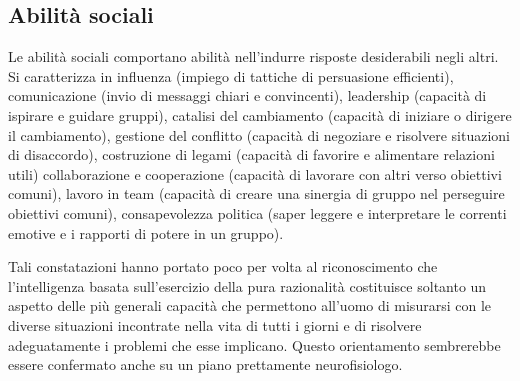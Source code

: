 \subsection{Abilità sociali}
Le abilità sociali comportano abilità nell'indurre risposte desiderabili negli altri. Si caratterizza in influenza (impiego di tattiche di persuasione efficienti), comunicazione (invio di messaggi chiari e convincenti), leadership (capacità di ispirare e guidare gruppi), catalisi del cambiamento (capacità di iniziare o dirigere il cambiamento),  gestione del conflitto (capacità di negoziare e risolvere situazioni di disaccordo), costruzione di legami (capacità di favorire e alimentare relazioni utili) collaborazione e cooperazione (capacità di lavorare con altri verso obiettivi comuni), lavoro in team (capacità di creare una sinergia di gruppo nel perseguire obiettivi comuni), consapevolezza politica (saper leggere e interpretare le correnti emotive e i rapporti di potere in un gruppo).

Tali constatazioni hanno portato poco per volta al riconoscimento che l'intelligenza basata sull'esercizio della pura razionalità costituisce soltanto un aspetto delle più generali capacità che permettono all'uomo di misurarsi con le diverse situazioni incontrate nella vita di tutti i giorni e di risolvere adeguatamente i problemi che esse implicano. Questo orientamento sembrerebbe essere confermato anche su un piano prettamente neurofisiologo.
